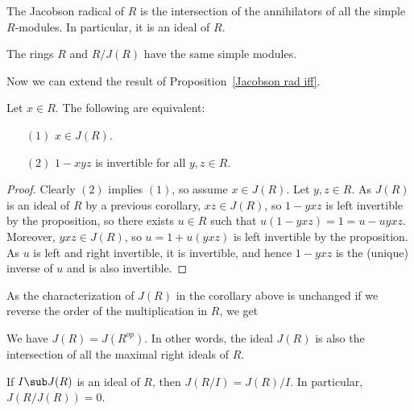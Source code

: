 \begin{corollary}
The Jacobson radical of $R$ is the intersection of the annihilators of all the simple $R$-modules. In particular, it is an ideal of $R$.
\end{corollary}
\begin{corollary}
The rings $R$ and $R/J(R)$ have the same simple modules.
\end{corollary}
Now we can extend the result of Proposition~\ref{Jacobson rad iff}.
\begin{corollary}
Let $x\in R$. The following are equivalent:
\begin{itemize}
\item[$(1)$] $x\in J(R)$.
\item[$(2)$] $1-xyz$ is invertible for all $y,z\in R$.
\end{itemize}
\begin{proof}
Clearly $(2)$ implies $(1)$, so assume $x\in J(R)$. Let $y,z\in R$. As $J(R)$ is an ideal of $R$ by a previous corollary, $xz\in J(R)$, so $1-yxz$ is left invertible by the proposition, so there exists $u\in R$ such that $u(1-yxz)=1=u-uyxz$. Moreover, $yxz\in J(R)$, so $u=1+u(yxz)$ is left invertible by the proposition. As $u$ is left and right invertible, it is invertible, and hence $1-yxz$ is the (unique) inverse of $u$ and is also invertible.
\end{proof}
\end{corollary}
As the characterization of $J(R)$ in the corollary above is unchanged if we reverse the order of the multiplication in $R$, we get
\begin{corollary}
We have $J(R)=J(R^{op})$. In other words, the ideal $J(R)$ is also the intersection of all the maximal right ideals of $R$.
\end{corollary}
\begin{remark}
If $I\sub J(R)$ is an ideal of $R$, then $J(R/I)=J(R)/I$. In particular, $J(R/J(R))=0$.
\end{remark}
